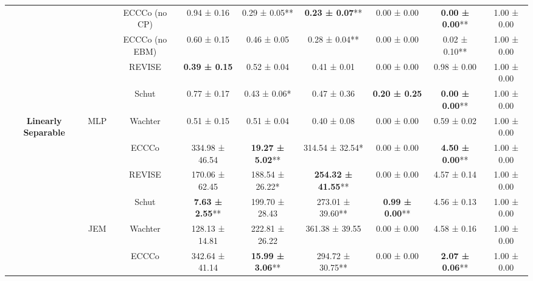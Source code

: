 \begin{table}
{\begin{tabular}[t]{>{}c|c|c|c|c|c|c|c|c}
 &  & ECCCo (no CP) & 0.94 ± 0.16\hphantom{*}\hphantom{*} & 0.29 ± 0.05** & \textbf{0.23 ± 0.07}** & 0.00 ± 0.00\hphantom{*}\hphantom{*} & \textbf{0.00 ± 0.00}** & 1.00 ± 0.00\hphantom{*}\hphantom{*}\\

 &  & ECCCo (no EBM) & 0.60 ± 0.15\hphantom{*}\hphantom{*} & 0.46 ± 0.05\hphantom{*}\hphantom{*} & 0.28 ± 0.04** & 0.00 ± 0.00\hphantom{*}\hphantom{*} & 0.02 ± 0.10** & 1.00 ± 0.00\hphantom{*}\hphantom{*}\\

 &  & REVISE & \textbf{0.39 ± 0.15}\hphantom{*}\hphantom{*} & 0.52 ± 0.04\hphantom{*}\hphantom{*} & 0.41 ± 0.01\hphantom{*}\hphantom{*} & 0.00 ± 0.00\hphantom{*}\hphantom{*} & 0.98 ± 0.00\hphantom{*}\hphantom{*} & 1.00 ± 0.00\hphantom{*}\hphantom{*}\\

 &  & Schut & 0.77 ± 0.17\hphantom{*}\hphantom{*} & 0.43 ± 0.06*\hphantom{*} & 0.47 ± 0.36\hphantom{*}\hphantom{*} & \textbf{0.20 ± 0.25}\hphantom{*}\hphantom{*} & \textbf{0.00 ± 0.00}** & 1.00 ± 0.00\hphantom{*}\hphantom{*}\\

\multirow{-12}{*}{\centering\arraybackslash \textbf{Linearly Separable}} & \multirow{-6}{*}{\centering\arraybackslash MLP} & Wachter & 0.51 ± 0.15\hphantom{*}\hphantom{*} & 0.51 ± 0.04\hphantom{*}\hphantom{*} & 0.40 ± 0.08\hphantom{*}\hphantom{*} & 0.00 ± 0.00\hphantom{*}\hphantom{*} & 0.59 ± 0.02\hphantom{*}\hphantom{*} & 1.00 ± 0.00\hphantom{*}\hphantom{*}\\
\cline{1-9}
 &  & ECCCo & 334.98 ± 46.54\hphantom{*}\hphantom{*} & \textbf{19.27 ± 5.02}** & 314.54 ± 32.54*\hphantom{*} & 0.00 ± 0.00\hphantom{*}\hphantom{*} & \textbf{4.50 ± 0.00}** & 1.00 ± 0.00\hphantom{*}\hphantom{*}\\

 &  & REVISE & 170.06 ± 62.45\hphantom{*}\hphantom{*} & 188.54 ± 26.22*\hphantom{*} & \textbf{254.32 ± 41.55}** & 0.00 ± 0.00\hphantom{*}\hphantom{*} & 4.57 ± 0.14\hphantom{*}\hphantom{*} & 1.00 ± 0.00\hphantom{*}\hphantom{*}\\

 &  & Schut & \textbf{7.63 ± 2.55}** & 199.70 ± 28.43\hphantom{*}\hphantom{*} & 273.01 ± 39.60** & \textbf{0.99 ± 0.00}** & 4.56 ± 0.13\hphantom{*}\hphantom{*} & 1.00 ± 0.00\hphantom{*}\hphantom{*}\\

 & \multirow{-4}{*}{\centering\arraybackslash JEM} & Wachter & 128.13 ± 14.81\hphantom{*}\hphantom{*} & 222.81 ± 26.22\hphantom{*}\hphantom{*} & 361.38 ± 39.55\hphantom{*}\hphantom{*} & 0.00 ± 0.00\hphantom{*}\hphantom{*} & 4.58 ± 0.16\hphantom{*}\hphantom{*} & 1.00 ± 0.00\hphantom{*}\hphantom{*}\\
\cline{2-9}
 &  & ECCCo & 342.64 ± 41.14\hphantom{*}\hphantom{*} & \textbf{15.99 ± 3.06}** & 294.72 ± 30.75** & 0.00 ± 0.00\hphantom{*}\hphantom{*} & \textbf{2.07 ± 0.06}** & 1.00 ± 0.00\hphantom{*}\hphantom{*}\\


\end{tabular}}
\end{table}
